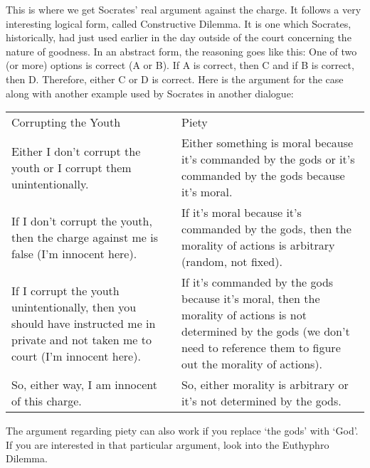 This is where we get Socrates' real argument against the charge. It follows a very interesting logical form, called Constructive Dilemma. It is one which Socrates, historically, had just used earlier in the day outside of the court concerning the nature of goodness. In an abstract form, the reasoning goes like this: One of two (or more) options is correct (A or B). If A is correct, then  C and if B is correct, then D. Therefore, either C or D is correct. Here is the argument for the case along with another example used by Socrates in another dialogue:
\noindent
\begin{tabular}{p{2.5in}|p{2.5in}}
Corrupting the Youth& Piety\\

    Either I don't corrupt the youth or I corrupt them unintentionally.&Either something is moral because it's commanded by the gods or it's commanded by the gods because it's moral.\\
    If I don't corrupt the youth, then the charge against me is false (I'm innocent here).&If it's moral because it's commanded by the gods, then the morality of actions is arbitrary (random, not fixed).\\
    If I corrupt the youth unintentionally, then you should have instructed me in private and not taken me to court (I'm innocent here).&If it's commanded by the gods because it's moral, then the morality of actions is not determined by the gods (we don't need to reference them to figure out the morality of actions).\\
    So, either way, I am innocent of this charge.&  So, either morality is arbitrary or it's not determined by the gods.\\
\end{tabular}

The argument regarding piety can also work if you replace `the gods' with `God'. If you are interested in that particular argument, look into the Euthyphro Dilemma.